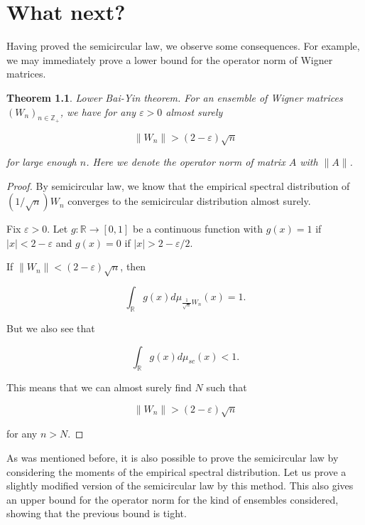 \documentclass[12pt,a4paper,leqno]{report}
\newcommand{\R}{\mathbb{R}}
\newcommand{\Z}{\mathbb{Z}}
\newcommand{\eps}{\varepsilon}
\theoremstyle{plain}
\newtheorem{theo}[equation]{Theorem}
\theoremstyle{definition}
\theoremstyle{remark}
\begin{document}
\chapter{What next?}
\label{future}

Having proved the semicircular law, we observe some consequences. For example, we may immediately prove a lower bound for the operator norm of Wigner matrices. 

\begin{theo}
\emph{Lower Bai-Yin theorem}. For an ensemble of Wigner matrices $(W_n)_{n \in \Z_+}$, we have for any $\eps > 0$ almost surely

\begin{equation*}
\|W_n\| > (2-\eps) \sqrt{n}
\end{equation*}

for large enough $n$. Here we denote the operator norm of matrix $A$ with $\| A \|$.
\end{theo}

\begin{proof}
By semicircular law, we know that the empirical spectral distribution of $(1/\sqrt{n}) W_n$ converges to the semicircular distribution almost surely.

Fix $\eps>0$. Let $g : \R \to [0,1]$ be a continuous function with
$g(x)= 1$ if $|x|<2-\eps$ and $g(x) = 0$ if $|x|>2-\eps/2$.

If $\|W_n\| < (2-\eps)\sqrt{n}$, then 

\begin{equation*}
\int_{\R} g(x) d\mu_{\frac{1}{\sqrt{n}}W_n}(x) = 1.
\end{equation*}

But we also see that

\begin{equation*}
\int_{\R} g(x) d\mu_{sc}(x) < 1.
\end{equation*}

This means that we can almost surely find $N$ such that

\begin{equation*}
\| W_n \| > (2-\eps) \sqrt{n}
\end{equation*}

for any $n>N$.
\end{proof}

As was mentioned before, it is also possible to prove the semicircular law by considering the moments of the empirical spectral distribution. Let us prove a slightly modified version of the semicircular law by this method. This also gives an upper bound for the operator norm for the kind of ensembles considered, showing that the previous bound is tight.
\end{document}
